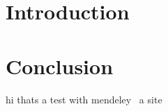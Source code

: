 \documentclass{article}
\title{}
\author{Bruno C. Messias}
\date{}
\begin{document}
\maketitle

\section{Introduction}



\subsection{}

\subsection{}

\subsection{}


\section{Conclusion}

hi \cite{Geron}
thats a test with mendeley~\cite{Nathan2012} a site~\cite{url}



\end{document}
